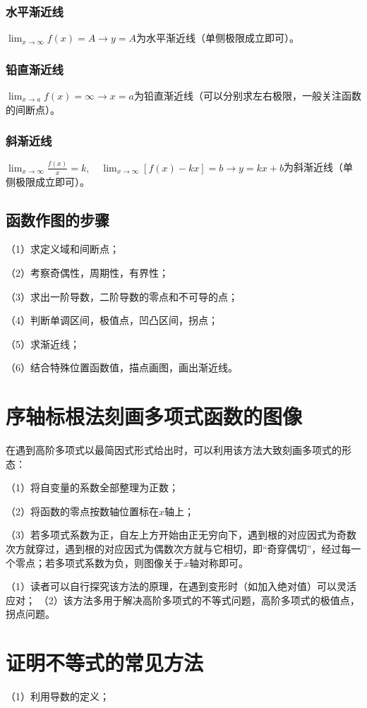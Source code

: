 \subsubsection{水平渐近线}
$\lim_{x\to\infty}f(x)=A\xrightarrow{} y=A$为水平渐近线（单侧极限成立即可）。
\subsubsection{铅直渐近线}
$\lim_{x\to a}f(x)=\infty\xrightarrow{}x=a$为铅直渐近线（可以分别求左右极限，一般关注函数的间断点）。
\subsubsection{斜渐近线}
$\lim_{x\to\infty}\frac{f(x)}{x}=k,\quad \lim_{x\to\infty}[f(x)-kx]=b\xrightarrow{}y=kx+b$为斜渐近线（单侧极限成立即可）。
\subsection{函数作图的步骤}
（1）求定义域和间断点；

（2）考察奇偶性，周期性，有界性；

（3）求出一阶导数，二阶导数的零点和不可导的点；

（4）判断单调区间，极值点，凹凸区间，拐点；

（5）求渐近线；

（6）结合特殊位置函数值，描点画图，画出渐近线。
\section{序轴标根法刻画多项式函数的图像}
在遇到高阶多项式以最简因式形式给出时，可以利用该方法大致刻画多项式的形态：

（1）将自变量的系数全部整理为正数；

（2）将函数的零点按数轴位置标在$x$轴上；

（3）若多项式系数为正，自左上方开始由正无穷向下，遇到根的对应因式为奇数次方就穿过，遇到根的对应因式为偶数次方就与它相切，即“奇穿偶切”，经过每一个零点；若多项式系数为负，则图像关于$x$轴对称即可。
\begin{remark}
	（1）读者可以自行探究该方法的原理，在遇到变形时（如加入绝对值）可以灵活应对；
	（2）该方法多用于解决高阶多项式的不等式问题，高阶多项式的极值点，拐点问题。
\end{remark}
\section{证明不等式的常见方法}
（1）利用导数的定义；

